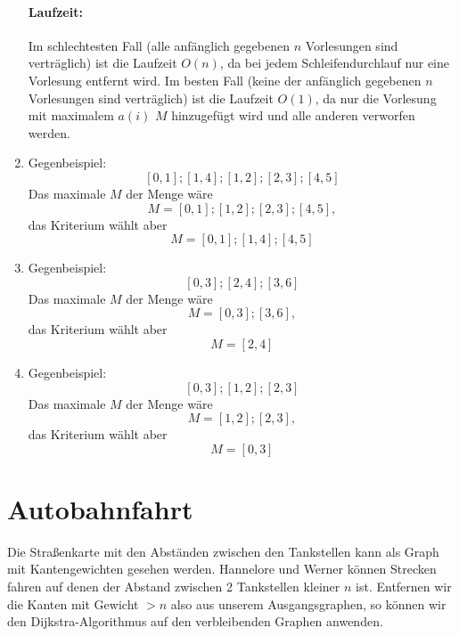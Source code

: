 \documentclass[a4paper,10pt]{article}
\begin{document}
\begin{enumerate}
        \paragraph*{Laufzeit:} Im schlechtesten Fall (alle anfänglich gegebenen $n$ Vorlesungen sind verträglich) ist die Laufzeit $O(n)$, da bei jedem Schleifendurchlauf nur eine Vorlesung entfernt wird.
        Im besten Fall (keine der anfänglich gegebenen $n$ Vorlesungen sind verträglich) ist die Laufzeit $O(1)$, da nur die Vorlesung mit maximalem $a(i)$ $M$ hinzugefügt wird und alle anderen verworfen werden.
\item   Gegenbeispiel:
        \[[0,1];[1,4];[1,2];[2,3];[4,5]\]
        Das maximale $M$ der Menge wäre 
        \[M = [0,1];[1,2];[2,3];[4,5],\] 
        das Kriterium wählt aber 
        \[M = [0,1];[1,4];[4,5]\]
\item   Gegenbeispiel:
        \[[0,3];[2,4];[3,6]\]
        Das maximale $M$ der Menge wäre 
        \[M = [0,3];[3,6],\] 
        das Kriterium wählt aber 
        \[M = [2,4]\]
\item   Gegenbeispiel:
        \[[0,3];[1,2];[2,3]\]
        Das maximale $M$ der Menge wäre 
        \[M = [1,2];[2,3],\] 
        das Kriterium wählt aber 
        \[M = [0,3]\]
\end{enumerate}

\section{Autobahnfahrt}
Die Straßenkarte mit den Abständen zwischen den Tankstellen kann als Graph mit Kantengewichten gesehen werden.
Hannelore und Werner können Strecken fahren auf denen der Abstand zwischen 2 Tankstellen kleiner $n$ ist. 
Entfernen wir die Kanten mit Gewicht $> n$ also aus unserem Ausgangsgraphen, so können wir den Dijkstra-Algorithmus auf den verbleibenden Graphen anwenden.
\end{document}

